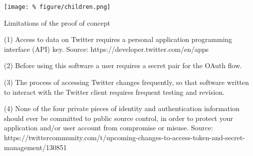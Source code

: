 \documentclass[unknownkeysallowed,usepdftitle=false, parskip=full]{beamer}
\newcommand{\secvariable}{nothing}
\begin{document}

\begin{frame}\label{\secvariable}

%
\texttt{[image: \%
figure/children.png]}\hspace{.05\textwidth}

Limitations of the proof of concept
\item 
(1) Access to data on Twitter requires a personal application programming interface (API) key. Source: https://developer.twitter.com/en/apps
\item 
(2) Before using this software a user requires a secret pair for the OAuth flow.
\item 
(3) The process of accessing Twitter changes frequently, so that software written to interact with the Twitter client requires frequent testing and revision.
\item 
(4) None of the four private pieces of identity and authentication information should ever be committed to public source control, in order to protect your application and/or user account from compromise or misuse.
Source: https://twittercommunity.com/t/upcoming-changes-to-access-token-and-secret-management/130851


\end{frame}
\end{document}
